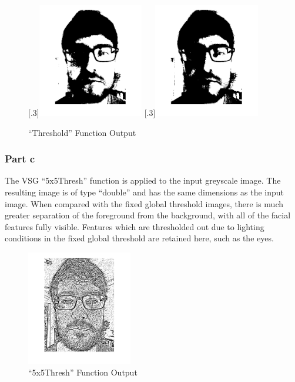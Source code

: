 \documentclass[a4paper]{article}
\begin{document}
	\begin{figure}[H]
		\centering
		[.3\linewidth]{\includegraphics[height=5cm]{Results/Q1/b/qbThresh130.jpg}}%
		[.3\linewidth]{\includegraphics[height=5cm]{Results/Q1/b/qbThresh140.jpg}}%
		\caption{``Threshold'' Function Output}
		\label{fig:}
	\end{figure}
	\subsubsection{Part c}
	The VSG ``5x5Thresh'' function is applied to the input greyscale image.
	The resulting image is of type ``double'' and has the same dimensions as
	the input image. When compared with the fixed global threshold images,
	there is much greater separation of the foreground from the background,
	with all of the facial features fully visible. Features which are
	thresholded out due to lighting conditions in the fixed global threshold
	are retained here, such as the eyes.
	\begin{figure}[H]
		\centering
		\includegraphics[height=5cm]{Results/Q1/c/qcThresh5x5.jpg}%
		\caption{``5x5Thresh'' Function Output}
		\label{fig:}
	\end{figure}
\end{document}
